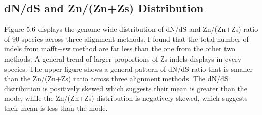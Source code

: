 \subsection{dN/dS and Zn/(Zn+Zs) Distribution}
Figure 5.6 displays the genome-wide distribution of dN/dS and Zn/(Zn+Zs) ratio of 90 species across three alignment methods. I found that the total number of indels from mafft+sw method are far less than the one from the other two methods. A general trend of larger proportions of Zs indels displays in every species. The upper figure shows a general pattern of dN/dS ratio that is smaller than the Zn/(Zn+Zs) ratio across three alignment methods. The dN/dS distribution is positively skewed which suggests their mean is greater than the mode, while the Zn/(Zn+Zs) distribution is negatively skewed, which suggests their mean is less than the mode.

